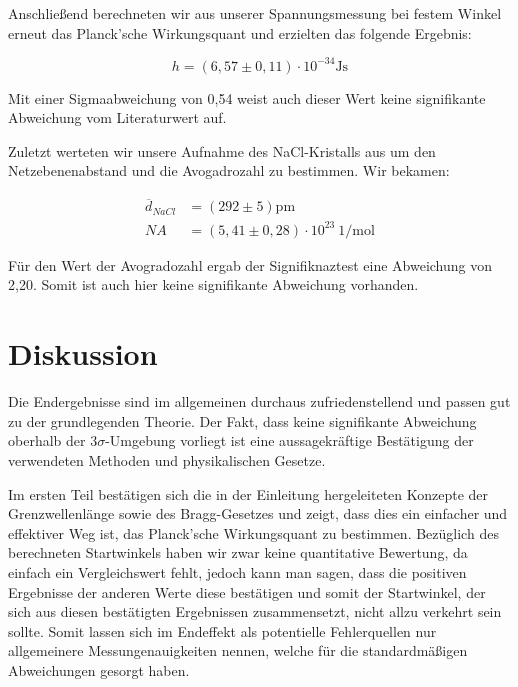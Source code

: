 \documentclass{article}
\begin{document}
Anschließend berechneten wir aus unserer Spannungsmessung bei festem Winkel erneut das Planck'sche Wirkungsquant und erzielten das folgende Ergebnis:

\begin{equation}
    h = (6,57 \pm 0,11) \cdot 10^{-34} \text{Js}
\end{equation}

Mit einer Sigmaabweichung von 0,54 weist auch dieser Wert keine signifikante Abweichung vom Literaturwert auf. 

Zuletzt werteten wir unsere Aufnahme des NaCl-Kristalls aus um den Netzebenenabstand und die Avogadrozahl zu bestimmen. Wir bekamen:

\begin{equation}
    \begin{split}
        \overline{d}_{NaCl} &= (292 \pm 5) \text{pm} \\
        NA &= (5,41 \pm 0,28) \cdot 10^{23} \ \text{1/mol}
    \end{split}
\end{equation}

Für den Wert der Avogradozahl ergab der Signifiknaztest eine Abweichung von 2,20. Somit ist auch hier keine signifikante Abweichung vorhanden. 



\newpage
\section{Diskussion}

Die Endergebnisse sind im allgemeinen durchaus zufriedenstellend und passen gut zu der grundlegenden Theorie. Der Fakt, dass keine signifikante Abweichung oberhalb der 3$\sigma$-Umgebung vorliegt ist eine aussagekräftige Bestätigung der verwendeten Methoden und physikalischen Gesetze. 

Im ersten Teil bestätigen sich die in der Einleitung hergeleiteten Konzepte der Grenzwellenlänge sowie des Bragg-Gesetzes und zeigt, dass dies ein einfacher und effektiver Weg ist, das Planck'sche Wirkungsquant zu bestimmen. Bezüglich des berechneten Startwinkels haben wir zwar keine quantitative Bewertung, da einfach ein Vergleichswert fehlt, jedoch kann man sagen, dass die positiven Ergebnisse der anderen Werte diese bestätigen und somit der Startwinkel, der sich aus diesen bestätigten Ergebnissen zusammensetzt, nicht allzu verkehrt sein sollte. Somit lassen sich im Endeffekt als potentielle Fehlerquellen nur allgemeinere Messungenauigkeiten nennen, welche für die standardmäßigen Abweichungen gesorgt haben. 
\end{document}

